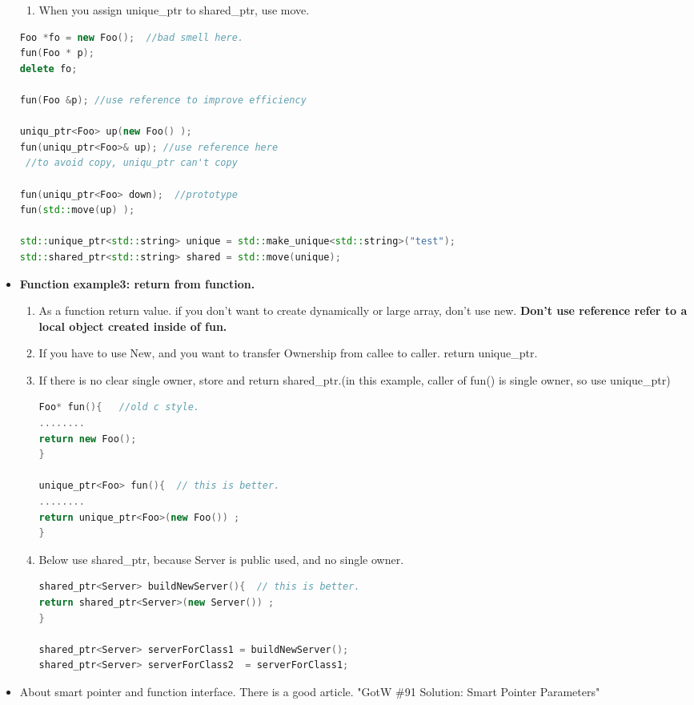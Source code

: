 \documentclass[a4paper,12pt,twoside]{book}
\begin{document}
\begin{itemize}
\begin{enumerate}
\item When you assign unique\_ptr to shared\_ptr, use move.
\end{enumerate}

\begin{lstlisting}[frame=single, language=c++]
Foo *fo = new Foo();  //bad smell here.
fun(Foo * p);
delete fo;

fun(Foo &p); //use reference to improve efficiency

uniqu_ptr<Foo> up(new Foo() );
fun(uniqu_ptr<Foo>& up); //use reference here
 //to avoid copy, uniqu_ptr can't copy

fun(uniqu_ptr<Foo> down);  //prototype
fun(std::move(up) );

std::unique_ptr<std::string> unique = std::make_unique<std::string>("test");
std::shared_ptr<std::string> shared = std::move(unique);
\end{lstlisting}

\item \textbf{Function example3: return from function.}
\begin{enumerate}
\item As a function return value. if you don't want to create dynamically or large array, don't use new. \textbf{Don't  use reference refer to a local object created inside of fun.}

\item If you have to use New, and you want to transfer Ownership from callee to caller. return unique\_ptr.

\item If there is no clear single owner, store and return shared\_ptr.(in this example, caller of fun() is single owner, so use unique\_ptr)


\begin{lstlisting}[frame=single, language=c++]
Foo* fun(){   //old c style.
........
return new Foo();
}

unique_ptr<Foo> fun(){  // this is better.
........
return unique_ptr<Foo>(new Foo()) ;
}
\end{lstlisting}

\item Below use shared\_ptr, because Server is public used, and no single owner.
\begin{lstlisting}[frame=single, language=c++]
shared_ptr<Server> buildNewServer(){  // this is better.
return shared_ptr<Server>(new Server()) ;
}

shared_ptr<Server> serverForClass1 = buildNewServer();
shared_ptr<Server> serverForClass2  = serverForClass1;
\end{lstlisting}

\end{enumerate}

\item About smart pointer and function interface. There is a good article. "GotW \#91 Solution: Smart Pointer Parameters"

\end{itemize}
\end{document}
